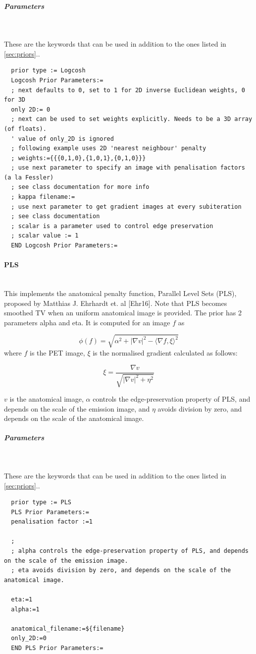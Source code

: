\documentclass{article}
\newcommand{\subsubsubsection}[1]{\paragraph{#1}\mbox{} \\}
\newcommand{\subsubsubsubsection}[1]{\subparagraph{#1} \mbox{} \\}
\begin{document}
{{{ \subsubsubsubsection{Parameters}
}
  These are the keywords that can be used in addition to the ones listed in \ref{sec:priors}..
  \begin{verbatim}
  prior type := Logcosh
  Logcosh Prior Parameters:=
  ; next defaults to 0, set to 1 for 2D inverse Euclidean weights, 0 for 3D 
  only 2D:= 0
  ; next can be used to set weights explicitly. Needs to be a 3D array (of floats).
  ' value of only_2D is ignored
  ; following example uses 2D 'nearest neighbour' penalty
  ; weights:={{{0,1,0},{1,0,1},{0,1,0}}}
  ; use next parameter to specify an image with penalisation factors (a la Fessler)
  ; see class documentation for more info
  ; kappa filename:=
  ; use next parameter to get gradient images at every subiteration
  ; see class documentation
  ; scalar is a parameter used to control edge preservation
  ; scalar value := 1
  END Logcosh Prior Parameters:=
  \end{verbatim}


{ \subsubsubsection{PLS}
This implements the  anatomical penalty function, Parallel Level Sets (PLS),  proposed by Matthias J. Ehrhardt et. al [Ehr16]. Note that
  PLS becomes smoothed TV when an uniform anatomical image is provided.  
The prior has 2 parameters alpha and eta. It is computed for an image $ f $ as

  \[
  \phi(f) = \sqrt{\alpha^2 + |\nabla v|^2 - {\langle\nabla f,\xi\rangle}^2}
  \]
  where $ f $ is the PET image, $ \xi $ is the normalised gradient calculated as follows:

  \[
  \xi = \frac{\nabla v}{\sqrt{|\nabla v|^2 + \eta^2}}
  \]

  $ v $ is the anatomical image, $ \alpha $ controls the edge-preservation property of PLS, and depends on the scale of the emission image,
  and $ \eta $ avoids division by zero, and depends on the scale of the anatomical image. 
}
{ \subsubsubsubsection{Parameters}
}
  These are the keywords that can be used in addition to the ones listed in \ref{sec:priors}..
  \begin{verbatim}
  prior type := PLS
  PLS Prior Parameters:=
  penalisation factor :=1

  ; 
  ; alpha controls the edge-preservation property of PLS, and depends on the scale of the emission image. 
  ; eta avoids division by zero, and depends on the scale of the anatomical image. 

  eta:=1
  alpha:=1

  anatomical_filename:=${filename}
  only_2D:=0
  END PLS Prior Parameters:=
  \end{verbatim}

}}
\end{document}
